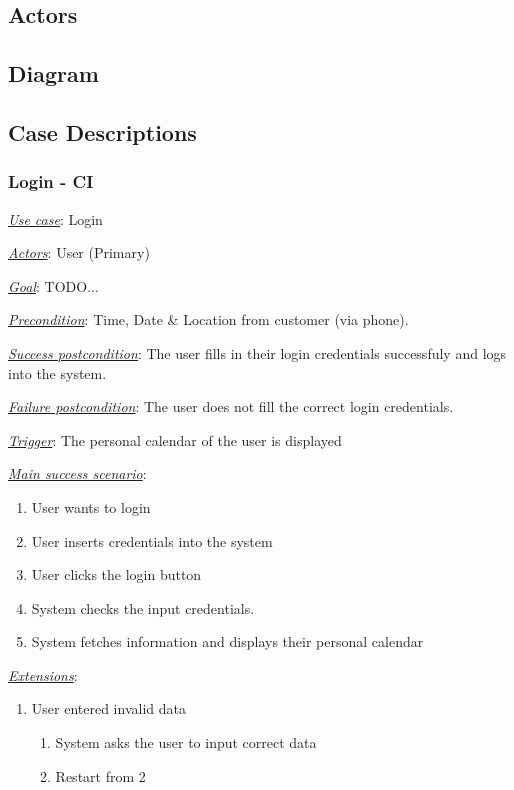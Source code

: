 \documentclass[a4paper]{article}
\begin{document}
\subsection{Actors}

\subsection{Diagram}

\subsection{Case Descriptions}
\subsubsection{Login - CI}
\underline{\textit{Use case}}: Login

\underline{\textit{Actors}}: User (Primary)

\underline{\textit{Goal}}: TODO... %

\underline{\textit{Precondition}}: Time, Date \& Location from customer (via phone).

\underline{\textit{Success postcondition}}: The user fills in their login credentials successfuly and logs into the system.

\underline{\textit{Failure postcondition}}: The user does not fill the correct login credentials.

\underline{\textit{Trigger}}: The personal calendar of the user is displayed

\underline{\textit{Main success scenario}}: 
\begin{enumerate}[leftmargin = 3em]
    \item User wants to login
    \item User inserts credentials into the system
    \item User clicks the login button
    \item System checks the input credentials.
    \item System fetches information and displays their personal calendar \\
\end{enumerate} 

\underline{\textit{Extensions}}:
\begin{enumerate}[label=3\alph*, leftmargin = 3em]
    \item User entered invalid data \begin{enumerate}[label=\arabic*.]
        \item System asks the user to input correct data
        \item Restart from 2
    \end{enumerate}
\end{enumerate}
\end{document}
